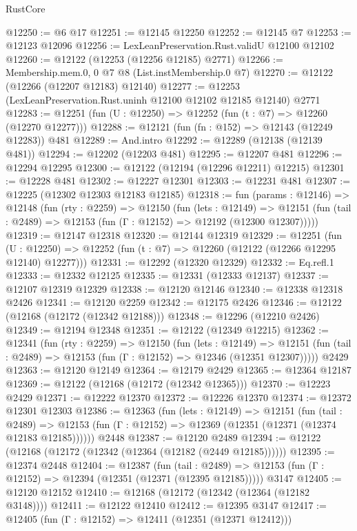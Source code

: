 \begin{lexlean}{RustCore}
\begin{coremodule}
@12250 := @6 @17
@12251 := @12145 @12250
@12252 := @12145 @7
@12253 := @12123 @12096
@12256 := LexLeanPreservation.Rust.validU @12100 @12102
@12260 := @12122 (@12253 (@12256 @12185) @2771)
@12266 := Membership.mem.{0, 0} @7 @8 (List.instMembership.{0} @7)
@12270 := @12122 (@12266 (@12207 @12183) @12140)
@12277 := @12253 (LexLeanPreservation.Rust.uninh @12100 @12102 @12185 @12140) @2771
@12283 := @12251 (fun (U : @12250) => @12252 (fun (t : @7) => @12260 (@12270 @12277)))
@12288 := @12121 (fun (fn : @152) => @12143 (@12249 @12283)) @481
@12289 := And.intro
@12292 := @12289 (@12138 (@12139 @481))
@12294 := @12202 (@12203 @481)
@12295 := @12207 @481
@12296 := @12294 @12295
@12300 := @12122 (@12194 (@12296 @12211) @12215)
@12301 := @12228 @481
@12302 := @12227 @12301
@12303 := @12231 @481
@12307 := @12225 (@12302 @12303 @12183 @12185)
@12318 := fun (params : @12146) =>
  @12148
    (fun (rty : @2259) =>
    @12150
      (fun (lets : @12149) =>
      @12151 (fun (tail : @2489) => @12153 (fun (Γ : @12152) => @12192 (@12300 @12307)))))
@12319 := @12147 @12318
@12320 := @12144 @12319
@12329 := @12251
    (fun (U : @12250) => @12252 (fun (t : @7) => @12260 (@12122 (@12266 @12295 @12140) @12277)))
@12331 := @12292 (@12320 @12329)
@12332 := Eq.refl.{1}
@12333 := @12332 @12125
@12335 := @12331 (@12333 @12137)
@12337 := @12107 @12319 @12329
@12338 := @12120 @12146
@12340 := @12338 @12318 @2426
@12341 := @12120 @2259
@12342 := @12175 @2426
@12346 := @12122 (@12168 (@12172 (@12342 @12188)))
@12348 := @12296 (@12210 @2426)
@12349 := @12194 @12348
@12351 := @12122 (@12349 @12215)
@12362 := @12341
    (fun (rty : @2259) =>
    @12150
      (fun (lets : @12149) =>
      @12151 (fun (tail : @2489) => @12153 (fun (Γ : @12152) => @12346 (@12351 @12307)))))
    @2429
@12363 := @12120 @12149
@12364 := @12179 @2429
@12365 := @12364 @12187
@12369 := @12122 (@12168 (@12172 (@12342 @12365)))
@12370 := @12223 @2429
@12371 := @12222 @12370
@12372 := @12226 @12370
@12374 := @12372 @12301 @12303
@12386 := @12363
    (fun (lets : @12149) =>
    @12151
      (fun (tail : @2489) =>
      @12153 (fun (Γ : @12152) => @12369 (@12351 (@12371 (@12374 @12183 @12185))))))
    @2448
@12387 := @12120 @2489
@12394 := @12122 (@12168 (@12172 (@12342 (@12364 (@12182 (@2449 @12185))))))
@12395 := @12374 @2448
@12404 := @12387
    (fun (tail : @2489) => @12153 (fun (Γ : @12152) => @12394 (@12351 (@12371 (@12395 @12185)))))
    @3147
@12405 := @12120 @12152
@12410 := @12168 (@12172 (@12342 (@12364 (@12182 @3148))))
@12411 := @12122 @12410
@12412 := @12395 @3147
@12417 := @12405 (fun (Γ : @12152) => @12411 (@12351 (@12371 @12412)))

\end{coremodule}
\end{lexlean}
